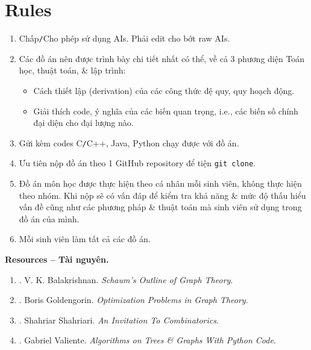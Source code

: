 \documentclass{article}
\begin{document}
\tableofcontents


\section*{Rules}

\begin{enumerate}
    \item Chấp{\tt/}Cho phép sử dụng AIs. Phải edit cho bớt raw AIs.
    \item Các đồ án nên được trình bày chi tiết nhất có thể, về cả 3 phương diện Toán học, thuật toán, \& lập trình:
    \begin{itemize}
        \item Cách thiết lập (derivation) của các công thức đệ quy, quy hoạch động.
        \item Giải thích code, ý nghĩa của các biến quan trọng, i.e., các biến số chính đại diện cho đại lượng nào.
    \end{itemize}
    \item Gửi kèm codes C{\tt/}C++, Java, Python chạy được với đồ án.
    \item Ưu tiên nộp đồ án theo 1 GitHub repository để tiện {\tt git clone}.
    \item Đồ án môn học được thực hiện theo cá nhân mỗi sinh viên, không thực hiện theo nhóm. Khi nộp sẽ có vấn đáp để kiểm tra khả năng \& mức độ thấu hiểu vấn đề cũng như các phương pháp \& thuật toán mà sinh viên sử dụng trong đồ án của mình.
    \item Mỗi sinh viên làm tất cả các đồ án.
\end{enumerate}
\textbf{\textsf{Resources -- Tài nguyên.}}
\begin{enumerate}
    \item \cite{Balakrishnan1997}. {\sc V. K. Balakrishnan}. {\it Schaum's Outline of Graph Theory}.

    \item \cite{Goldengorin2018}. {\sc Boris Goldengorin}. {\it Optimization Problems in Graph Theory}.

    \item \cite{Shahriari2022}. {\sc Shahriar Shahriari}. {\it An Invitation To Combinatorics}.

    \item \cite{Valiente2002, Valiente2021}. {\sc Gabriel Valiente}. {\it Algorithms on Trees \& Graphs With Python Code}.
\end{enumerate}
\end{document}
